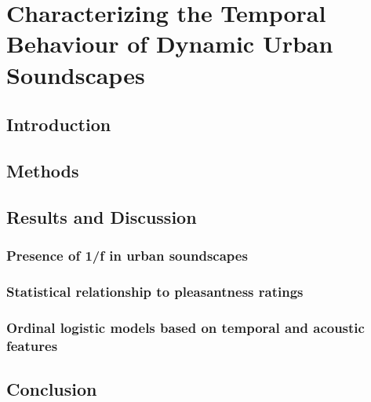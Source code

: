 \chapter{Characterizing the Temporal Behaviour of Dynamic Urban Soundscapes}
\label{ch:temp}

\section{Introduction}

\section{Methods}

\section{Results and Discussion}
  \subsection{Presence of 1/f in urban soundscapes}
  \subsection{Statistical relationship to pleasantness ratings}
  \subsection{Ordinal logistic models based on temporal and acoustic features}

\section{Conclusion}
